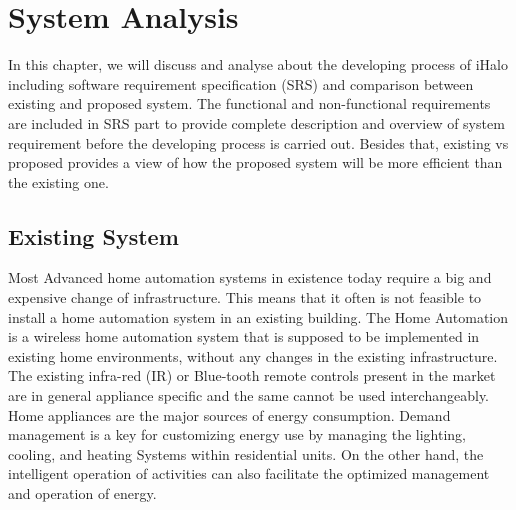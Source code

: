 \chapter{System Analysis}
\thispagestyle{fancy}
In this chapter, we will discuss and analyse about the developing process of iHalo including software requirement specification (SRS) and comparison between existing and proposed system. The functional and non-functional requirements are included in SRS part to provide complete description and overview of system requirement before the developing process is carried out. Besides that, existing vs proposed provides a view of how the proposed system will be more efficient than the existing one.
\section{Existing System}
\thispagestyle{fancy}
Most Advanced home automation systems in existence today require a big and expensive change of infrastructure. This means that it often is not feasible to install a home automation system in an existing building. The Home Automation is a wireless home automation system that is supposed to be implemented in existing home environments, without any changes in the existing infrastructure. The existing infra-red (IR) or Blue-tooth remote controls present in the market are in general appliance specific and the same cannot be used interchangeably. Home appliances are the major sources of energy consumption. Demand management is a key for customizing energy use by managing the lighting, cooling, and heating Systems within residential units. On the other hand, the intelligent operation of activities can also facilitate the optimized management and operation of energy.
